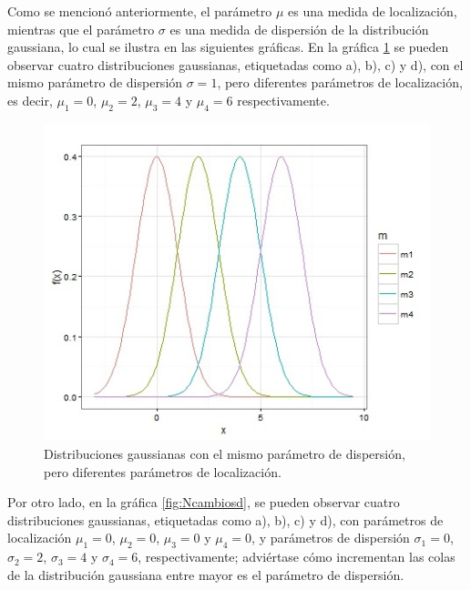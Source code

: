 Como se mencionó anteriormente, el parámetro $\mu$ es una medida de localización, mientras que el parámetro $\sigma$ es una medida de dispersión de la distribución gaussiana, lo cual se ilustra en las siguientes gráficas. En la gráfica \ref{fig:Ncambioenmedia} se pueden observar cuatro distribuciones gaussianas, etiquetadas como a), b), c) y d), con el mismo parámetro de dispersión $\sigma=1$, pero diferentes parámetros de localización, es decir,  $\mu_{1}=0$, $\mu_{2}=2$, $\mu_{3}=4$ y $\mu_{4}=6$ respectivamente.

\begin{figure}[h!]
	\centering
	\includegraphics[width=.8\linewidth]{Figuras/cambiosenmedia.jpeg}
	\caption{Distribuciones gaussianas con el mismo par\'ametro de dispersi\'on, pero diferentes par\'ametros de localizaci\'on.}
	\label{fig:Ncambioenmedia}
\end{figure}

Por otro lado, en la gráfica \ref{fig:Ncambiosd}, se pueden observar cuatro distribuciones gaussianas, etiquetadas como a), b), c) y d), con parámetros de localización $\mu_{1}=0$, $\mu_{2}=0$, $\mu_{3}=0$ y $\mu_{4}=0$, y parámetros de dispersión $\sigma_{1}=0$, $\sigma_{2}=2$, $\sigma_{3}=4$ y $\sigma_{4}=6$, respectivamente; adviértase cómo incrementan las colas de la distribución gaussiana entre mayor es el parámetro de dispersión.

